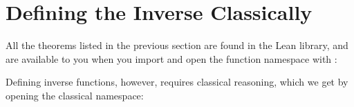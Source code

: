 \documentclass[letterpaper,10pt,english]{sphinxmanual}
\begin{document}
\section{Defining the Inverse Classically}
\label{\detokenize{functions_in_lean:defining-the-inverse-classically}}
\sphinxAtStartPar
All the theorems listed in the previous section are found in the Lean
library, and are available to you when you
import  and open the function namespace
with :

\begin{sphinxVerbatim}[commandchars=\\\{\}]
 
 

 
 
 
\end{sphinxVerbatim}

\sphinxAtStartPar
Defining inverse functions, however, requires classical reasoning, which
we get by opening the classical namespace:

\begin{sphinxVerbatim}[commandchars=\\\{\}]
 
 

      
       
         

                        

             
   
\end{sphinxVerbatim}
\end{document}
